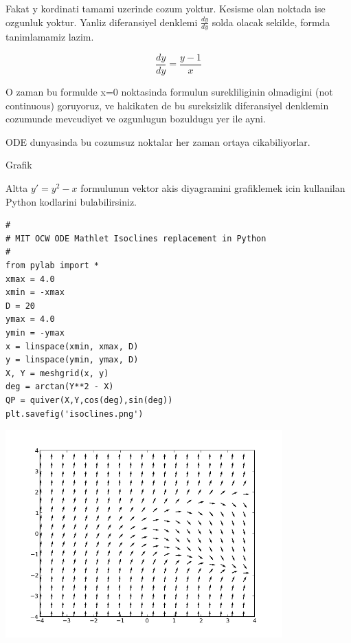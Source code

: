 \documentclass[12pt,fleqn]{article}\usepackage{../common}
\begin{document}
Fakat y kordinati tamami uzerinde cozum yoktur. Kesisme olan noktada ise
ozgunluk yoktur. Yanliz diferansiyel denklemi $\frac{dy}{dy}$ solda olacak
sekilde, formda tanimlamamiz lazim. 

\[ \frac{dy}{dy} = \frac{y-1}{x} \]

O zaman bu formulde x=0 noktasinda formulun surekliliginin olmadigini (not
continuous) goruyoruz, ve hakikaten de bu sureksizlik diferansiyel denklemin
cozumunde mevcudiyet ve ozgunlugun bozuldugu yer ile ayni. 

ODE dunyasinda bu cozumsuz noktalar her zaman ortaya cikabiliyorlar. 

Grafik

Altta $y' = y^2-x$ formulunun vektor akis diyagramini grafiklemek icin
kullanilan Python kodlarini bulabilirsiniz.

\begin{verbatim}
#
# MIT OCW ODE Mathlet Isoclines replacement in Python
#
from pylab import *
xmax = 4.0
xmin = -xmax
D = 20
ymax = 4.0
ymin = -ymax
x = linspace(xmin, xmax, D)
y = linspace(ymin, ymax, D)
X, Y = meshgrid(x, y)
deg = arctan(Y**2 - X)
QP = quiver(X,Y,cos(deg),sin(deg))
plt.savefig('isoclines.png')
\end{verbatim}

\includegraphics[height=8cm]{isoclines.png}
\end{document}

